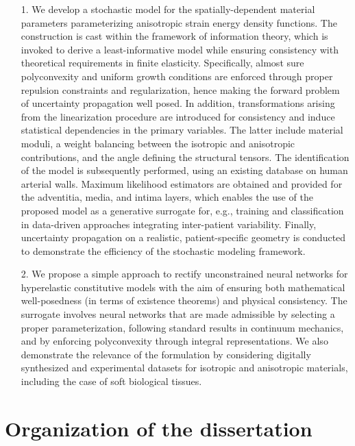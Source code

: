 \begin{itemize}
    \item[1.] We develop a stochastic model for the spatially-dependent material parameters parameterizing anisotropic strain energy density functions. The construction is cast within the framework of information theory, which is invoked to derive a least-informative model while ensuring consistency with theoretical requirements in finite elasticity. Specifically, almost sure polyconvexity and uniform growth conditions are enforced through proper repulsion constraints and regularization, hence making the forward problem of uncertainty propagation well posed. In addition, transformations arising from the linearization procedure are introduced for consistency and induce statistical dependencies in the primary variables. The latter include material moduli, a weight balancing between the isotropic and anisotropic contributions, and the angle defining the structural tensors. The identification of the model is subsequently performed, using an existing database on human arterial walls. Maximum likelihood estimators are obtained and provided for the adventitia, media, and intima layers, which enables the use of the proposed model as a generative surrogate for, e.g., training and classification in data-driven approaches integrating inter-patient variability. Finally, uncertainty propagation on a realistic, patient-specific geometry is conducted to demonstrate the efficiency of the stochastic modeling framework.
    \item[2.] We propose a simple approach to rectify unconstrained neural networks for hyperelastic constitutive models with the aim of ensuring both mathematical well-posedness (in terms of existence theorems) and physical consistency. The surrogate involves neural networks that are made admissible by selecting a proper parameterization, following standard results in continuum mechanics, and by enforcing polyconvexity through integral representations. We also demonstrate the relevance of the formulation by considering digitally synthesized and experimental datasets for isotropic and anisotropic materials, including the case of soft biological tissues.
\end{itemize}

\section{Organization of the dissertation}

